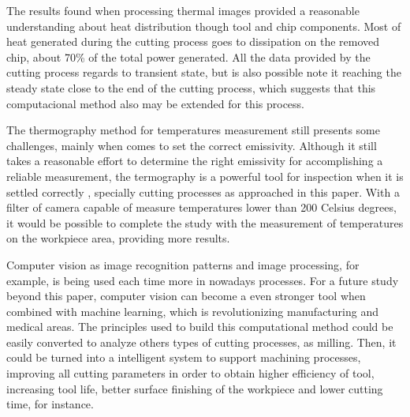 The results found when processing thermal images provided a reasonable understanding about heat distribution though tool and chip components. Most of heat generated during the cutting process goes to dissipation on the removed chip, about 70\% of the total power generated. All the data provided by the cutting process regards to transient state, but is also possible note it reaching the steady state close to the end of the cutting process, which suggests that this computacional method also may be extended for this process.

The thermography method for temperatures measurement still presents some challenges, mainly when comes to set the correct emissivity. Although it still takes a reasonable effort to determine the right emissivity for accomplishing a reliable measurement, the termography is a powerful tool for inspection when it is settled correctly , specially cutting processes as approached in this paper. With a filter of camera capable of measure temperatures lower than 200 Celsius degrees, it would be possible to complete the study with the measurement of temperatures on the workpiece area, providing more results.

Computer vision as image recognition patterns and image processing, for example, is being used each time more in nowadays processes. For a future study beyond this paper, computer vision can become a even stronger tool when combined with machine learning, which is revolutionizing manufacturing and medical areas. The principles used to build this computational method could be easily converted to analyze others types of cutting processes, as milling. Then, it could be turned into a intelligent system to support machining processes, improving all cutting parameters in order to obtain higher efficiency of tool, increasing tool life, better surface finishing of the workpiece and lower cutting time, for instance.
